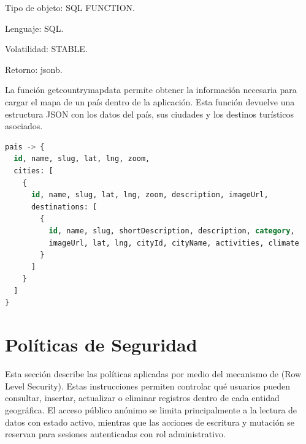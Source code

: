 \documentclass[12pt,letterpaper]{article}
\newcommand{\code}[1]{\texorpdfstring{\begingroup\normalfont\normalsize\def\_{\textunderscore\allowbreak}#1\endgroup}{#1}}
\begin{document}
Tipo de objeto: SQL FUNCTION.

Lenguaje: SQL.

Volatilidad: STABLE.

Retorno: \code{jsonb}.

La función \code{get\_country\_map\_data} permite obtener la información necesaria para cargar el mapa de un país dentro de la aplicación. Esta función devuelve una estructura JSON con los datos del país, sus ciudades y los destinos turísticos asociados.

\begin{lstlisting}[language=sql]
pais -> {
  id, name, slug, lat, lng, zoom,
  cities: [
    {
      id, name, slug, lat, lng, zoom, description, imageUrl,
      destinations: [
        {
          id, name, slug, shortDescription, description, category,
          imageUrl, lat, lng, cityId, cityName, activities, climate
        }
      ]
    }
  ]
}
\end{lstlisting}

\section{Políticas de Seguridad}

Esta sección describe las políticas aplicadas por medio del mecanismo de (Row Level Security). Estas instrucciones permiten controlar qué usuarios pueden consultar, insertar, actualizar o eliminar registros dentro de cada entidad geográfica. El acceso público anónimo se limita principalmente a la lectura de datos con estado activo, mientras que las acciones de escritura y mutación se reservan para sesiones autenticadas con rol administrativo.
\end{document}
